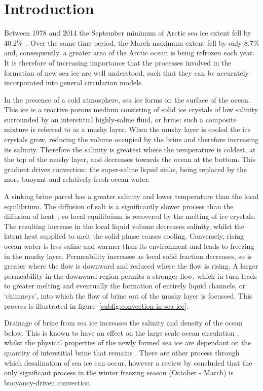 \documentclass[11pt]{proc}
\begin{document}
\section{Introduction}
\label{sec:intro}
Between 1978 and 2014 the September minimum of Arctic sea ice extent fell by 40.2\%~\citep*{fetterer-02}. Over the same time period, the March maximum extent fell by only 8.7\% and, consequently, a greater area of the Arctic ocean is being refrozen each year. It is therefore of increasing importance that the processes involved in the formation of new sea ice are well understood, such that they can be accurately incorporated into general circulation models. 

In the presence of a cold atmosphere, sea ice forms on the surface of the ocean. This ice is a reactive porous medium consisting of solid ice crystals of low salinity surrounded by an interstitial highly-saline fluid, or brine; such a composite mixture is referred to as a mushy layer. When the mushy layer is cooled the ice crystals grow, reducing the volume occupied by the brine and therefore increasing its salinity. Therefore the salinity is greatest where the temperature is coldest, at the top of the mushy layer, and decreases towards the ocean at the bottom. This gradient drives convection; the super-saline liquid sinks, being replaced by the more buoyant and relatively fresh ocean water. 

A sinking brine parcel has a greater salinity and lower temperature than the local equilibrium. The diffusion of salt is a significantly slower process than the diffusion of heat~\citep*{worster-97}, so local equilibrium is recovered by the melting of ice crystals. The resulting increase in the local liquid volume decreases salinity, whilst the latent heat supplied to melt the solid phase causes cooling. Conversely, rising ocean water is less saline and warmer than its environment and leads to freezing in the mushy layer. Permeability increases as local solid fraction decreases, so is greater where the flow is downward and reduced where the flow is rising. A larger permeability in the downward region permits a stronger flow, which in turn leads to greater melting and eventually the formation of entirely liquid channels, or `chimneys', into which the flow of brine out of the mushy layer is focussed. This process is illustrated in figure~\ref{subfig:convection-in-sea-ice}.

Drainage of brine from sea ice increases the salinity and density of the ocean below. This is known to have an effect on the large scale ocean circulation \citep*{brandon-et-al-10}, whilst the physical properties of the newly formed sea ice are dependant on the quantity of interstitial brine that remains \citep*{petrich-eicken-10}. There are other process through which desalination of sea ice can occur, however a review by \citet*{notz-worster-09} concluded that the only significant process in the winter freezing season (October - March) is buoyancy-driven convection. 
\end{document}

